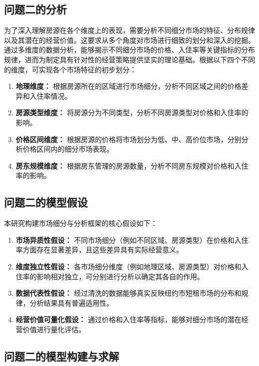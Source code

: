 \documentclass[12pt]{article}
\begin{document}
\begin{CJK}{UTF8}{gbsn}
	\subsection{问题二的分析}
	为了深入理解房源在各个维度上的表现，需要分析不同细分市场的特征、分布规律以及其潜在的经营价值。这要求从多个角度对市场进行细致的划分和深入的挖掘。通过多维度的数据分析，能够揭示不同细分市场的价格、入住率等关键指标的分布规律，进而为制定具有针对性的经营策略提供坚实的理论基础。根据以下四个不同的维度，可实现各个市场特征的初步划分：
	\begin{enumerate}
		\item \textbf{地理维度：} 根据房源所在的区域进行市场细分，分析不同区域之间的价格差异和入住率情况。
		\item \textbf{房源类型维度：} 将房源分为不同类型，分析不同房源类型对价格和入住率的影响。
		\item \textbf{价格区间维度：} 根据房源的价格将市场划分为低、中、高价位市场，分别分析价格区间内的细分市场表现。
		\item \textbf{房东规模维度：} 根据房东管理的房源数量，分析不同房东规模对价格和入住率的影响。
	\end{enumerate}
	
	\subsection{问题二的模型假设}
	本研究构建市场细分与分析框架的核心假设如下：
	\begin{enumerate}
		\item \textbf{市场异质性假设：} 不同市场细分（例如不同区域、房源类型）在价格和入住率方面存在显著差异，且这些差异具有实际经营意义。
		\item \textbf{维度独立性假设：} 各市场细分维度（例如地理区域、房源类型）对价格和入住率的影响相对独立，可分别进行分析以确定其各自的作用。
		\item \textbf{数据代表性假设：} 经过清洗的数据能够真实反映纽约市短租市场的分布和规律，分析结果具有普遍适用性。
		\item \textbf{经营价值可量化假设：} 通过价格和入住率等指标，能够对细分市场的潜在经营价值进行量化评估。
	\end{enumerate}
	
	\subsection{问题二的模型构建与求解}
	

\end{CJK}
\end{document}
